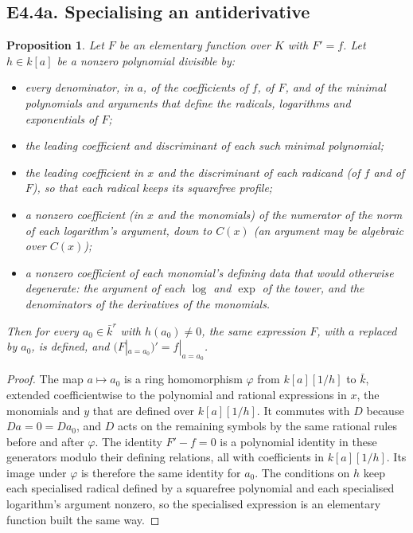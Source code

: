 \documentclass[11pt]{article}
\newtheorem{proposition}[theorem]{Proposition}
\theoremstyle{definition}
\theoremstyle{remark}
\begin{document}
\subsection*{E4.4a. Specialising an antiderivative}

\begin{proposition}\label{prop:E44spec}
Let $F$ be an elementary function over $K$ with $F'=f$. Let $h\in k[a]$ be a nonzero
polynomial divisible by:
\begin{itemize}
\item every denominator, in $a$, of the coefficients of $f$, of $F$, and of the
  minimal polynomials and arguments that define the radicals, logarithms and
  exponentials of $F$;
\item the leading coefficient and discriminant of each such minimal polynomial;
\item the leading coefficient in $x$ and the discriminant of each radicand (of $f$ and
  of $F$), so that each radical keeps its squarefree profile;
\item a nonzero coefficient (in $x$ and the monomials) of the numerator of the
  \emph{norm} of each logarithm's argument, down to $C(x)$ (an argument may be
  algebraic over $C(x)$);
\item a nonzero coefficient of each monomial's defining data that would otherwise
  degenerate: the argument of each $\log$ and $\exp$ of the tower, and the
  denominators of the derivatives of the monomials.
\end{itemize}
Then for every $a_0\in\bar k^r$ with $h(a_0)\ne0$, the \emph{same expression} $F$, with
$a$ replaced by $a_0$, is defined, and $(F|_{a=a_0})'=f|_{a=a_0}$.
\end{proposition}
\begin{proof}
The map $a\mapsto a_0$ is a ring homomorphism $\varphi$ from $k[a][1/h]$ to $\bar k$,
extended coefficientwise to the polynomial and rational expressions in $x$, the
monomials and $y$ that are defined over $k[a][1/h]$. It commutes with $D$ because
$Da=0=Da_0$, and $D$ acts on the remaining symbols by the same rational rules before
and after $\varphi$. The identity $F'-f=0$ is a polynomial identity in these
generators modulo their defining relations, all with coefficients in $k[a][1/h]$. Its
image under $\varphi$ is therefore the same identity for $a_0$. The conditions on $h$
keep each specialised radical defined by a squarefree polynomial and each specialised
logarithm's argument nonzero, so the specialised expression is an elementary function
built the same way.
\end{proof}
\end{document}
